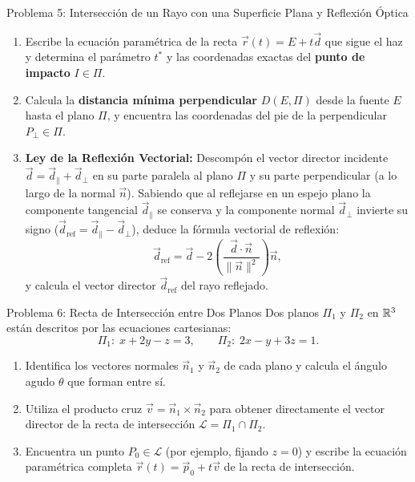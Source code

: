 \documentclass[11pt,letterpaper]{article}
\begin{document}
\begin{infobox}{Problema 5: Intersección de un Rayo con una Superficie Plana y Reflexión Óptica}
\begin{enumerate}[label=(\alph*)]
    \item Escribe la ecuación paramétrica de la recta $\vec{r}(t) = E + t\vec{d}$ que sigue el haz y determina el parámetro $t^*$ y las coordenadas exactas del \textbf{punto de impacto} $I \in \Pi$.
    \item Calcula la \textbf{distancia mínima perpendicular} $D(E, \Pi)$ desde la fuente $E$ hasta el plano $\Pi$, y encuentra las coordenadas del pie de la perpendicular $P_\perp \in \Pi$.
    \item \textbf{Ley de la Reflexión Vectorial:} Descompón el vector director incidente $\vec{d} = \vec{d}_\parallel + \vec{d}_\perp$ en su parte paralela al plano $\Pi$ y su parte perpendicular (a lo largo de la normal $\vec{n}$). Sabiendo que al reflejarse en un espejo plano la componente tangencial $\vec{d}_\parallel$ se conserva y la componente normal $\vec{d}_\perp$ invierte su signo ($\vec{d}_{\text{ref}} = \vec{d}_\parallel - \vec{d}_\perp$), deduce la fórmula vectorial de reflexión:
    \[
        \vec{d}_{\text{ref}} = \vec{d} - 2\left(\frac{\vec{d}\cdot\vec{n}}{\|\vec{n}\|^2}\right)\vec{n},
    \]
    y calcula el vector director $\vec{d}_{\text{ref}}$ del rayo reflejado.
\end{enumerate}
\end{infobox}

\begin{infobox}{Problema 6: Recta de Intersección entre Dos Planos}
Dos planos $\Pi_1$ y $\Pi_2$ en $\mathbb{R}^3$ están descritos por las ecuaciones cartesianas:
\[
    \Pi_1:\; x + 2y - z = 3, \qquad \Pi_2:\; 2x - y + 3z = 1.
\]
\begin{enumerate}[label=(\alph*)]
    \item Identifica los vectores normales $\vec{n}_1$ y $\vec{n}_2$ de cada plano y calcula el ángulo agudo $\theta$ que forman entre sí.
    \item Utiliza el producto cruz $\vec{v} = \vec{n}_1 \times \vec{n}_2$ para obtener directamente el vector director de la recta de intersección $\mathcal{L} = \Pi_1 \cap \Pi_2$.
    \item Encuentra un punto $P_0 \in \mathcal{L}$ (por ejemplo, fijando $z = 0$) y escribe la ecuación paramétrica completa $\vec{r}(t) = \vec{p}_0 + t\vec{v}$ de la recta de intersección.
\end{enumerate}
\end{infobox}
\end{document}
